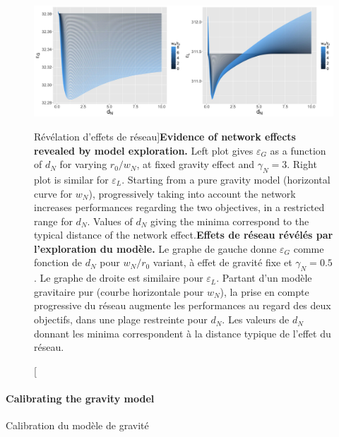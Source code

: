 \begin{figure}
\includegraphics[width=\linewidth]{Figures/Final/4-3-2-fig-interactiongibrat-networkeffects}
\caption[Evidence of network effects][Révélation d'effets de réseau]{\textbf{Evidence of network effects revealed by model exploration.} Left plot gives $\varepsilon_G$ as a function of $d_N$ for varying $r_0/w_N$, at fixed gravity effect and $\gamma_N=3$. Right plot is similar for $\varepsilon_L$. Starting from a pure gravity model (horizontal curve for $w_N$), progressively taking into account the network increases performances regarding the two objectives, in a restricted range for $d_N$. Values of $d_N$ giving the minima correspond to the typical distance of the network effect.\label{fig:interactiongibrat:networkeffects}}{\textbf{Effets de réseau révélés par l'exploration du modèle.} Le graphe de gauche donne $\varepsilon_G$ comme fonction de $d_N$ pour $w_N/r_0$ variant, à effet de gravité fixe et $\gamma_N=0.5$. Le graphe de droite est similaire pour $\varepsilon_L$. Partant d'un modèle gravitaire pur (courbe horizontale pour $w_N$), la prise en compte progressive du réseau augmente les performances au regard des deux objectifs, dans une plage restreinte pour $d_N$. Les valeurs de $d_N$ donnant les minima correspondent à la distance typique de l'effet du réseau.\label{fig:interactiongibrat:networkeffects}}
\end{figure}






\paragraph{Calibrating the gravity model}{Calibration du modèle de gravité}


